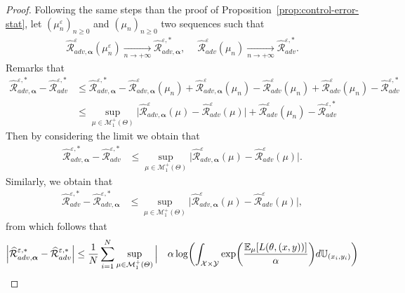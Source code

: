 \begin{proof}
Following the same steps than the proof of Proposition~\ref{prop:control-error-stat}, let $(\mu_n^{\varepsilon})_{n\geq 0}$ and $(\mu_n)_{n\geq 0}$ two sequences such that
\begin{align*}
    \widehat{\mathcal{R}}_{adv,\bm{\alpha}}^{\varepsilon}(\mu_n^{\varepsilon})\xrightarrow[n \to +\infty]{}\widehat{\mathcal{R}}_{adv,\bm{\alpha}}^{\varepsilon,*},~\quad \widehat{\mathcal{R}}_{adv}^{\varepsilon}(\mu_n)\xrightarrow[n \to +\infty]{}\widehat{\mathcal{R}}_{adv}^{\varepsilon,*}.
\end{align*}
Remarks that 
\begin{align*}
  \widehat{\mathcal{R}}_{adv,\bm{\alpha}}^{\varepsilon,*} - \widehat{\mathcal{R}}_{adv}^{\varepsilon,*}&\leq \widehat{\mathcal{R}}_{adv,\bm{\alpha}}^{\varepsilon,*} - \widehat{\mathcal{R}}_{adv,\bm{\alpha}}^{\varepsilon}(\mu_n) + \widehat{\mathcal{R}}_{adv,\bm{\alpha}}^{\varepsilon}(\mu_n) -   \widehat{\mathcal{R}}_{adv}^{\varepsilon}(\mu_n)+ \widehat{\mathcal{R}}_{adv}^{\varepsilon}(\mu_n)-\widehat{\mathcal{R}}_{adv}^{\varepsilon,*}\\
  &\leq \sup_{\mu\in\mathcal{M}_1^{+}(\Theta)}\Big|\widehat{\mathcal{R}}_{adv,\bm{\alpha}}^{\varepsilon}(\mu) -   \widehat{\mathcal{R}}_{adv}^{\varepsilon}(\mu)  \Big| + \widehat{\mathcal{R}}_{adv}^{\varepsilon}(\mu_n)-\widehat{\mathcal{R}}_{adv}^{\varepsilon,*}
\end{align*}
Then by considering the limit we obtain that 
\begin{align*}
    \widehat{\mathcal{R}}_{adv,\bm{\alpha}}^{\varepsilon,*} - \widehat{\mathcal{R}}_{adv}^{\varepsilon,*}&\leq \sup_{\mu\in\mathcal{M}_1^{+}(\Theta)}\Big|\widehat{\mathcal{R}}_{adv,\bm{\alpha}}^{\varepsilon}(\mu) -   \widehat{\mathcal{R}}_{adv}^{\varepsilon}(\mu)  \Big|.
\end{align*}
Similarly, we obtain that 
\begin{align*}
     \widehat{\mathcal{R}}_{adv}^{\varepsilon,*}-\widehat{\mathcal{R}}_{adv,\bm{\alpha}}^{\varepsilon,*}&\leq \sup_{\mu\in\mathcal{M}_1^{+}(\Theta)}\Big|\widehat{\mathcal{R}}_{adv,\bm{\alpha}}^{\varepsilon}(\mu) -   \widehat{\mathcal{R}}_{adv}^{\varepsilon}(\mu)  \Big|,
\end{align*}
from which follows that
\begin{align*}
 \Big| \widehat{\mathcal{R}}_{adv,\bm{\alpha}}^{\varepsilon,*} - \widehat{\mathcal{R}}_{adv}^{\varepsilon,*}\Big|&\leq \frac{1}{\numsamples}\sum_{i=1}^\numsamples\sup_{\mu\in\mathcal{M}_1^{+}(\Theta)}\Big|&\alpha\log\left(\int_{\mathcal{X}\times\mathcal{Y}}\exp\left(\frac{\mathbb{E}_{\mu}[\loss(\theta,(x,y))]}{\alpha} \right) d\mathbb{U}_{(x_i,y_i)}\right)\\

\end{align*}
\end{proof}
